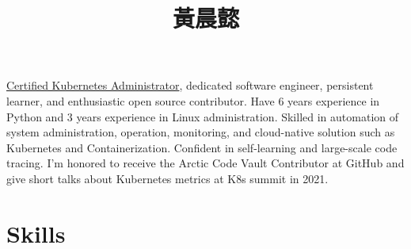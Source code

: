 \documentclass[11pt,a4paper,sans]{moderncv} %
\title{黃晨懿}
\newcommand{\obj}[1]{
  \par\nobreak\addvspace{1ex}
}
\begin{document}
\makecvtitle %
\vspace{-3\baselineskip}
\obj{Objective}
\href{https://ti-user-certificates.s3.amazonaws.com/e0df7fbf-a057-42af-8a1f-590912be5460/ca820404-2858-41da-9d18-c3268d010348-huang-chen-yi-80c3b11d-2f72-4183-8271-9743fe40b47d-certificate.pdf}{Certified Kubernetes Administrator}, dedicated software engineer, persistent learner, and enthusiastic open source contributor. Have 6 years experience in Python and 3 years experience in Linux administration. Skilled in automation of system administration, operation, monitoring, and cloud-native solution such as Kubernetes and Containerization. Confident in self-learning and large-scale code tracing. I'm honored to receive the Arctic Code Vault Contributor at GitHub and give short talks about Kubernetes metrics at K8s summit in 2021.



\section{Skills}

\end{document}
